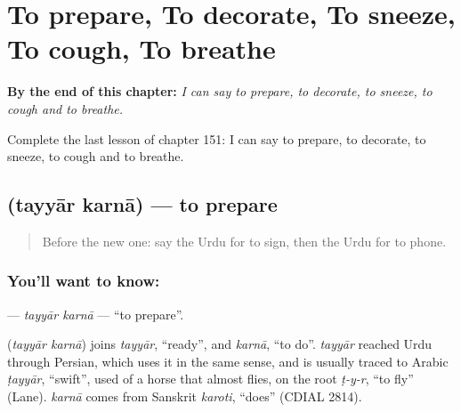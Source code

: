 
\chapter{To prepare, To decorate, To sneeze, To cough, To breathe}
\label{ch:ur-to-prepare-to-decorate-to-sneeze-to-cough-to-breathe}

\begin{chapteropening}
\textbf{By the end of this chapter:} \emph{I can say to prepare, to decorate, to sneeze, to cough and to breathe.}

Complete the last lesson of chapter 151: I can say to prepare, to decorate, to sneeze, to cough and to breathe.
\end{chapteropening}

\section[\texorpdfstring{\ur{تیار} \ur{کرنا} (tayyār karnā)}{تیار کرنا (tayyār karnā)}]{  (tayyār karnā) — to prepare}

\label{lesson:UR-C151-tayyar-karna}



\begin{quote}
Before the new one: say the Urdu for to sign, then the Urdu for to phone.
\end{quote}

\subsection*{You'll want to know:  }
\textbf{ } — \emph{tayyār karnā} — \textquotedblleft{}to prepare\textquotedblright{}.

\begin{cousinweb}
\textbf{ } (\emph{tayyār karnā}) joins \emph{tayyār}, \textquotedblleft{}ready\textquotedblright{}, and \emph{karnā}, \textquotedblleft{}to do\textquotedblright{}. \emph{tayyār} reached Urdu through Persian, which uses it in the same sense, and is usually traced to Arabic \emph{ṭayyār}, \textquotedblleft{}swift\textquotedblright{}, used of a horse that almost flies, on the root \emph{ṭ-y-r}, \textquotedblleft{}to fly\textquotedblright{} (Lane). \emph{karnā} comes from Sanskrit \emph{karoti}, \textquotedblleft{}does\textquotedblright{} (CDIAL 2814).
\end{cousinweb}


